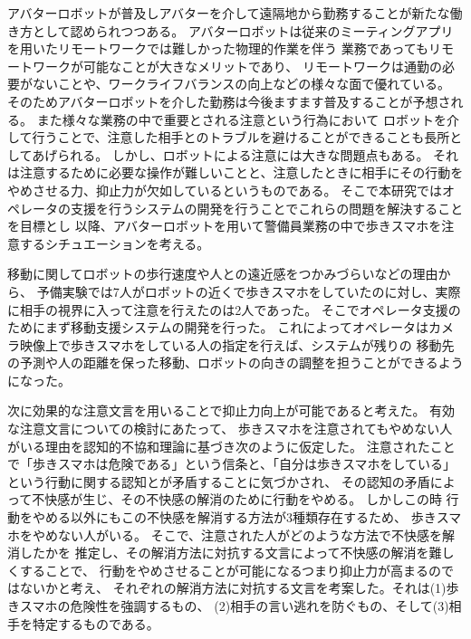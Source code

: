 \documentclass{kuisthesis}
\date{2024年1月31日}
\begin{document}
\maketitle

\begin{jabstract}


アバターロボットが普及しアバターを介して遠隔地から勤務することが新たな働き方として認められつつある。
アバターロボットは従来のミーティングアプリを用いたリモートワークでは難しかった物理的作業を伴う
業務であってもリモートワークが可能なことが大きなメリットであり、
リモートワークは通勤の必要がないことや、ワークライフバランスの向上などの様々な面で優れている。
そのためアバターロボットを介した勤務は今後ますます普及することが予想される。
また様々な業務の中で重要とされる注意という行為において
ロボットを介して行うことで、注意した相手とのトラブルを避けることができることも長所としてあげられる。
しかし、ロボットによる注意には大きな問題点もある。
それは注意するために必要な操作が難しいことと、注意したときに相手にその行動をやめさせる力、抑止力が欠如しているというものである。
そこで本研究ではオペレータの支援を行うシステムの開発を行うことでこれらの問題を解決することを目標とし
以降、アバターロボットを用いて警備員業務の中で歩きスマホを注意するシチュエーションを考える。

移動に関してロボットの歩行速度や人との遠近感をつかみづらいなどの理由から、
予備実験では7人がロボットの近くで歩きスマホをしていたのに対し、実際に相手の視界に入って注意を行えたのは2人であった。
そこでオペレータ支援のためにまず移動支援システムの開発を行った。
これによってオペレータはカメラ映像上で歩きスマホをしている人の指定を行えば、システムが残りの
移動先の予測や人の距離を保った移動、ロボットの向きの調整を担うことができるようになった。

次に効果的な注意文言を用いることで抑止力向上が可能であると考えた。
有効な注意文言についての検討にあたって、
歩きスマホを注意されてもやめない人がいる理由を認知的不協和理論に基づき次のように仮定した。
注意されたことで「歩きスマホは危険である」という信条と、「自分は歩きスマホをしている」という行動に関する認知とが矛盾することに気づかされ、
その認知の矛盾によって不快感が生じ、その不快感の解消のために行動をやめる。
しかしこの時
行動をやめる以外にもこの不快感を解消する方法が3種類存在するため、
歩きスマホをやめない人がいる。
そこで、注意された人がどのような方法で不快感を解消したかを
推定し、その解消方法に対抗する文言によって不快感の解消を難しくすることで、
行動をやめさせることが可能になるつまり抑止力が高まるのではないかと考え、
それぞれの解消方法に対抗する文言を考案した。それは(1)歩きスマホの危険性を強調するもの、
(2)相手の言い逃れを防ぐもの、そして(3)相手を特定するものである。


\end{jabstract}
\end{document}
